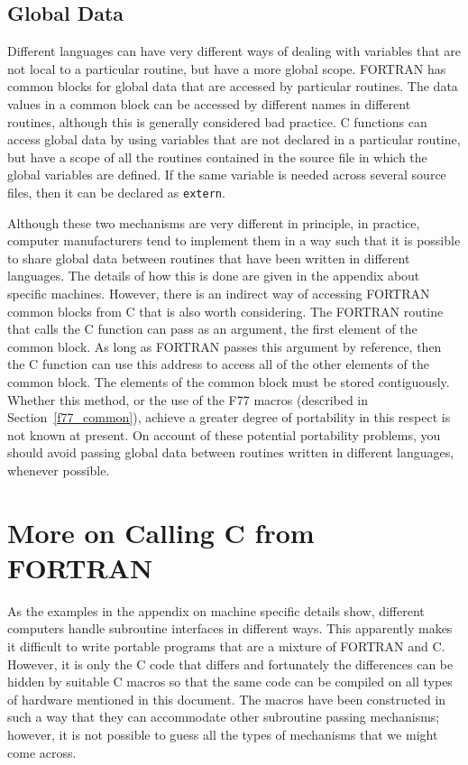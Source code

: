 \documentclass[twoside,11pt]{article}
\newcommand{\htmlref}[2]{#1}
\newcommand{\latex}[1]{#1}
\newcommand{\xlabel}[1]{}
\renewcommand{\_}{\texttt{\symbol{95}}}
\newcounter{examples}
\begin{document}
\subsection{\xlabel{global_data}Global Data}

Different languages can have very different ways of dealing with variables that
are not local to a particular routine, but have a more global scope. FORTRAN
has common blocks for global data that are accessed by particular routines. The
data values in a common block can be accessed by different names in different
routines, although this is generally considered bad practice. C functions can
access global data by using variables that are not declared in a particular
routine, but have a scope of all the routines contained in the source file in
which the global variables are defined. If the same variable is needed across
several source files, then it can be declared as \texttt{extern}.

Although these two mechanisms are very different in principle, in practice,
computer manufacturers tend to implement them in a way such that it is possible
to share global data between routines that have been written in different
languages. The details of how this is done are given in the appendix about
specific machines. However, there is an indirect way of accessing FORTRAN
common blocks from C that is also worth considering. The FORTRAN routine that
calls the C function can pass as an argument, the first element of the common
block. As long as FORTRAN passes this argument by reference, then the C
function can use this address to access all of the other elements of the common
block. The elements of the common block must be stored contiguously. Whether
this method, or the use of the 
\htmlref{F77 macros}{f77_common}\latex{ (described in 
Section~\ref{f77_common})},
achieve a greater degree of portability in this respect is not known at
present. On account of these potential portability problems, you should avoid
passing global data between routines written in different languages, whenever
possible.

\section{\xlabel{more_on_calling_c_from_fortran}\label{f77_cfromf}More on 
Calling C from FORTRAN}
As the examples in the appendix on machine specific details show, different
computers handle subroutine interfaces in different ways. This apparently makes
it difficult to write portable programs that are a mixture of FORTRAN and C\@.
However, it is only the C code that differs and fortunately the differences can
be hidden by suitable C macros so that the same code can be compiled on all
types of hardware mentioned in this document. The macros have been constructed
in such a way that they can accommodate other subroutine passing mechanisms;
however, it is not possible to guess all the types of mechanisms that we might
come across.
\end{document}
